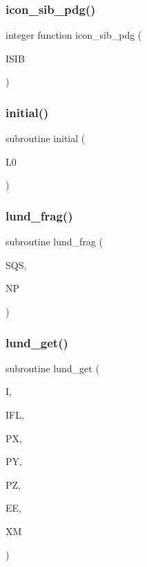 \subsubsection{\texorpdfstring{icon\+\_\+sib\+\_\+pdg()}{icon\_sib\_pdg()}}
{\footnotesize\ttfamily integer function icon\+\_\+sib\+\_\+pdg (\begin{DoxyParamCaption}\item[{}]{I\+S\+IB }\end{DoxyParamCaption})}

\mbox{\label{sophia_8f_a8043d12e12d2dca411a957f5e6faa35d}} 
\subsubsection{\texorpdfstring{initial()}{initial()}}
{\footnotesize\ttfamily subroutine initial (\begin{DoxyParamCaption}\item[{}]{L0 }\end{DoxyParamCaption})}

\mbox{\label{sophia_8f_aa2514852059ffefd5e81067e0416b369}} 
\subsubsection{\texorpdfstring{lund\+\_\+frag()}{lund\_frag()}}
{\footnotesize\ttfamily subroutine lund\+\_\+frag (\begin{DoxyParamCaption}\item[{}]{S\+QS,  }\item[{}]{NP }\end{DoxyParamCaption})}

\mbox{\label{sophia_8f_a60e0415dfc0daee02345071f23c94998}} 
\subsubsection{\texorpdfstring{lund\+\_\+get()}{lund\_get()}}
{\footnotesize\ttfamily subroutine lund\+\_\+get (\begin{DoxyParamCaption}\item[{}]{I,  }\item[{}]{I\+FL,  }\item[{}]{PX,  }\item[{}]{PY,  }\item[{}]{PZ,  }\item[{}]{EE,  }\item[{}]{XM }\end{DoxyParamCaption})}

